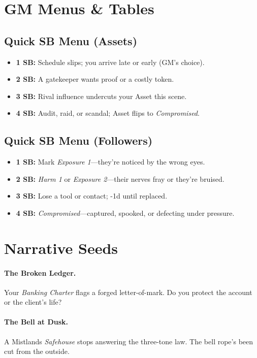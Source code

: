 \begin{multicols}{2}
\section{GM Menus \& Tables}
\subsection*{Quick SB Menu (Assets)}
\begin{itemize}
  \item \textbf{1 SB:} Schedule slips; you arrive late or early (GM’s choice).
  \item \textbf{2 SB:} A gatekeeper wants proof or a costly token.
  \item \textbf{3 SB:} Rival influence undercuts your Asset this scene.
  \item \textbf{4 SB:} Audit, raid, or scandal; Asset flips to \emph{Compromised}.
\end{itemize}

\subsection*{Quick SB Menu (Followers)}
\begin{itemize}
  \item \textbf{1 SB:} Mark \emph{Exposure 1}—they’re noticed by the wrong eyes.
  \item \textbf{2 SB:} \emph{Harm 1} or \emph{Exposure 2}—their nerves fray or they’re bruised.
  \item \textbf{3 SB:} Lose a tool or contact; -1d until replaced.
  \item \textbf{4 SB:} \emph{Compromised}—captured, spooked, or defecting under pressure.
\end{itemize}

\section{Narrative Seeds}
\paragraph{The Broken Ledger.}
Your \emph{Banking Charter} flags a forged letter-of-mark. Do you protect the account or the client’s life?

\paragraph{The Bell at Dusk.}
A Mistlands \emph{Safehouse} stops answering the three-tone law. The bell rope’s been cut from the outside.


\end{multicols}
